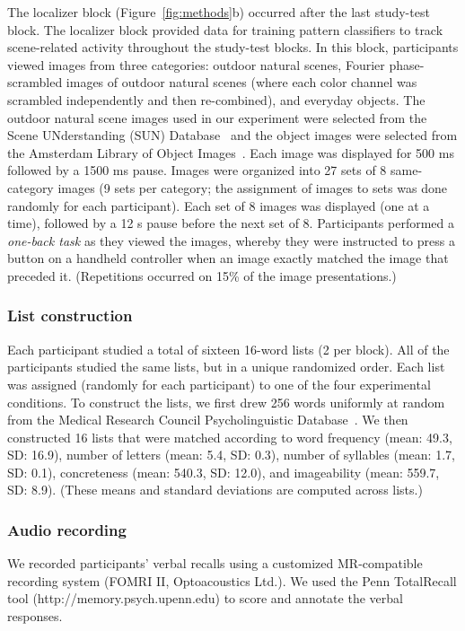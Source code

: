 \documentclass[11pt]{article}
\begin{document}
The localizer block (Figure~\ref{fig:methods}b) occurred after the
last study-test block.  The localizer block provided data for training
pattern classifiers to track scene-related activity throughout the
study-test blocks.  In this block, participants viewed images from
three categories: outdoor natural scenes, Fourier phase-scrambled images of
outdoor natural scenes (where each color channel was scrambled independently
and then re-combined), and everyday objects.  The outdoor natural scene
images used in our experiment were selected from the Scene
UNderstanding (SUN) Database~\citep{XiaoEtal10} and the object images
were selected from the Amsterdam Library of Object Images~\citep[ALOI;
][]{GeusEtal05}.  Each image was displayed for 500 ms followed by a
1500 ms pause.  Images were organized into 27 sets of 8 same-category
images (9 sets per category; the assignment of images to sets was done
randomly for each participant). Each set of 8 images was displayed
(one at a time), followed by a 12 s pause before the next set of 8.
Participants performed a \textit{one-back task} as they viewed the
images, whereby they were instructed to press a button on a handheld
controller when an image exactly matched the image that preceded it.
(Repetitions occurred on 15\% of the image presentations.)

\subsubsection*{List construction}
Each participant studied a total of sixteen 16-word lists (2 per
block).  All of the participants studied the same lists, but in a
unique randomized order.  Each list was assigned (randomly for each
participant) to one of the four experimental conditions.  To construct
the lists, we first drew 256 words uniformly at random from the
Medical Research Council Psycholinguistic Database~\citep{Colt81}.  We
then constructed 16 lists that were matched according to word
frequency (mean: 49.3, SD: 16.9), number of letters (mean: 5.4, SD:
0.3), number of syllables (mean: 1.7, SD: 0.1), concreteness (mean:
540.3, SD: 12.0), and imageability (mean: 559.7, SD: 8.9).  (These
means and standard deviations are computed across lists.)

\subsubsection*{Audio recording}
We recorded participants'
verbal recalls using a customized MR-compatible recording system
(FOMRI II, Optoacoustics Ltd.).  We used the Penn TotalRecall
tool (http://memory.psych.upenn.edu) to score and annotate the verbal
responses.
\end{document}
